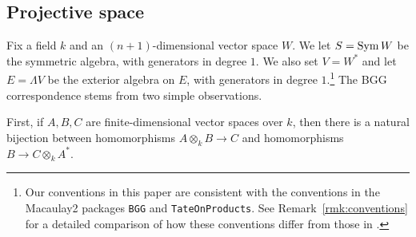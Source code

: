 \documentclass[twoside,12pt, leqno]{amsart}
\def\PP{{\mathbb P}}
\begin{document}

\subsection{Projective space}
Fix a field $k$ and an $(n+1)$-dimensional vector space $W$.  We let $S=\operatorname{Sym} W$ be the symmetric algebra, with generators in degree $1$.  We also set $V=W^*$ and let $E=\Lambda V$ be the exterior algebra on $E$, with generators in degree $1$.\footnote{Our conventions in this paper are consistent with the conventions in the Macaulay2 packages {\tt BGG} and {\tt TateOnProducts}.  See Remark~\ref{rmk:conventions} for a detailed comparison of how these conventions differ from those in \cite{EFS,EES}.}  The BGG correspondence stems from two simple observations.

First, if $A, B, C$ are finite-dimensional vector spaces over $k$, then there is a natural bijection between  homomorphisms $A\otimes_kB\to C$ and homomorphisms
$ B \to C\otimes_k A^*$.
\end{document}
